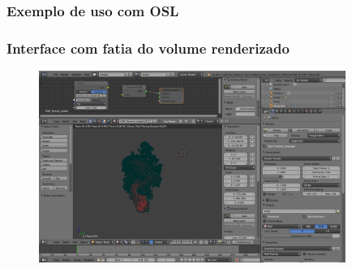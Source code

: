 \documentclass{beamer}
\begin{document}

\begin{frame}

\frametitle{Exemplo de uso com OSL}



\end{frame}


\begin{frame}

\frametitle{Interface com fatia do volume renderizado}

\begin{figure}[!htb]
\center
\includegraphics[width=10cm]{vdb_blender_interface}
\end{figure}
\end{frame}
\end{document}
